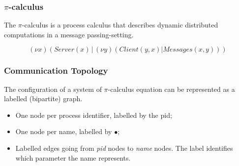 \documentclass{beamer}
\newcommand{\pical}{$\pi$-calculus}
\newcommand{\tikzMessageNode}[2]{
  \node[draw,thick,fill=white,rectangle,inner sep=0pt,minimum height=0.4cm,minimum width=0.6cm] (#1) at (#2) {};
  \path[draw,-,thick] (#2) -- ++(-0.3, 0.2) (#2) -- ++(0.3, 0.2); 
}
\begin{document}
\begin{frame}
  \frametitle{\pical}
  The $\pi$-calculus \cite{DBLP:journals/iandc/MilnerPW92a,DBLP:journals/iandc/MilnerPW92b}
  is a process calculus that describes dynamic distributed computations in a message passing-setting.

\vspace{10pt}

  \[(\nu x)(Server(x) \,|\, (\nu y)(Client(y,x) | Messages(x,y))) \]
  
  \begin{center}
  \end{center}
  
\end{frame}

\iffalse
\begin{frame}
  \frametitle{Communication Topology}
  The configuration of a system of \pical{} equation can be represented as a labelled (bipartite) graph.
  \begin{itemize}
  \item One node per process identifier, labelled by the pid;
  \item One node per name, labelled by $\bullet$;
  \item Labelled edges going from \emph{pid} nodes to \emph{name} nodes.
  The label identifies which parameter the name represents.
  \end{itemize}
\end{frame}
\end{document}
